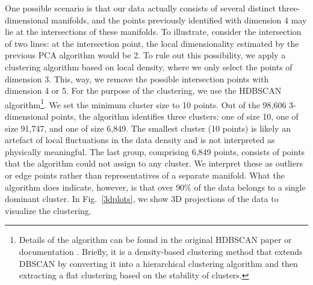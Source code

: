 \documentclass[11pt]{article}
\begin{document}
		One possible scenario is that our data actually consists of several distinct three-dimensional manifolds, and the points previously identified with dimension $4$ may lie at the intersections of these manifolds. To illustrate, consider the intersection of two lines: at the intersection point, the local dimensionality estimated by the previous PCA algorithm would be 2. To rule out this possibility, we apply a clustering algorithm based on local density, where we only select the points of dimension 3. This, way, we remove the possible intersection points with dimension 4 or 5. For the purpose of the clustering, we use the HDBSCAN algorithm\footnote{Details of the algorithm can be found in the original HDBSCAN paper or documentation \cite{10.1007/978-3-642-37456-2_14}. Briefly, it is a density-based clustering method that extends DBSCAN by converting it into a hierarchical clustering algorithm and then extracting a flat clustering based on the stability of clusters.}.
		We set the minimum cluster size to 10 points. Out of the 98,606 3-dimensional points, the algorithm identifies three clusters: one of size 10, one of size 91,747, and one of size 6,849. 
		The smallest cluster (10 points) is likely an artefact of local fluctuations in the data density and is not interpreted as physically meaningful. The last group, comprising 6,849 points, consists of points that the algorithm could not assign to any cluster. We interpret these as outliers or edge points rather than representatives of a separate manifold.
		What the algorithm does indicate, however, is that over 90\% of the data belongs to a single dominant cluster. In Fig.~\ref{3dplots}, we show 3D projections of the data to visualize the clustering. 
\end{document}
